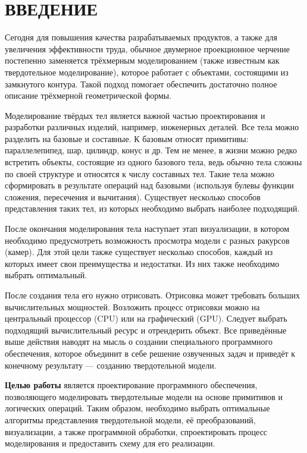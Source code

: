 \section*{ВВЕДЕНИЕ}

Сегодня для повышения качества разрабатываемых продуктов, а также для увеличения эффективности труда, обычное двумерное проекционное черчение постепенно заменяется трёхмерным моделированием (также известным как твердотельное моделирование), которое работает с объектами, состоящими из замкнутого контура. 
Такой подход помогает обеспечить достаточно полное описание трёхмерной геометрической формы.

Моделирование твёрдых тел является важной частью проектирования и разработки различных изделий, например, инженерных деталей. 
Все тела можно разделить на базовые и составные. 
К базовым относят примитивы: параллелепипед, шар, цилиндр, конус и др. 
Тем не менее, в жизни можно редко встретить объекты, состоящие из одного базового тела, ведь обычно тела сложны по своей структуре и относятся к числу составных тел. 
Такие тела можно сформировать в результате операций над базовыми (используя булевы функции сложения, пересечения и вычитания). 
Существует несколько способов представления таких тел, из которых необходимо выбрать наиболее подходящий.

После окончания моделирования тела наступает этап визуализации, в котором необходимо предусмотреть возможность просмотра модели с разных ракурсов (камер). 
Для этой цели также существует несколько способов, каждый из которых имеет свои преимущества и недостатки. 
Из них также необходимо выбрать оптимальный.

После создания тела его нужно отрисовать. 
Отрисовка может требовать больших вычислительных мощностей. 
Возложить процесс отрисовки можно на центральный процессор (CPU) или на графический (GPU). 
Следует выбрать подходящий вычислительный ресурс и отрендерить объект. 
Все приведённые выше действия наводят на мысль о создании специального программного обеспечения, которое объединит в себе решение озвученных задач и приведёт к конечному результату --- созданию твердотельной модели.

\textbf{Целью работы} является проектирование программного обеспечения, позволяющего моделировать твердотельные модели на основе примитивов и логических операций. 
Таким образом, необходимо выбрать оптимальные алгоритмы представления твердотельной модели, её преобразований, визуализации, а также программной обработки, спроектировать процесс моделирования и предоставить схему для его реализации. 
\pagebreak